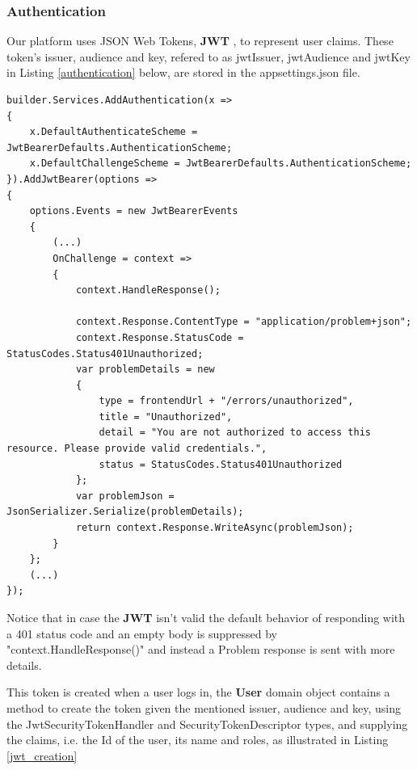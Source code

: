 \newpage

\subsubsection{Authentication}

Our platform uses JSON Web Tokens, \textbf{JWT} \cite{rfc7519}, to represent user claims.
These token's issuer, audience and key, refered to as jwtIssuer, jwtAudience and jwtKey in Listing \ref{authentication} below, are stored in the appsettings.json file.

\begin{lstlisting}[style=sharpc, caption={Custom JWT Authentication Middleware in ASP.NET Core: Handling Unauthorized Access with Detailed Problem Responses.}, label={authentication}] 
builder.Services.AddAuthentication(x =>
{
	x.DefaultAuthenticateScheme = JwtBearerDefaults.AuthenticationScheme;
	x.DefaultChallengeScheme = JwtBearerDefaults.AuthenticationScheme;
}).AddJwtBearer(options =>
{
	options.Events = new JwtBearerEvents
	{
		(...)
		OnChallenge = context =>
		{
			context.HandleResponse();
			
			context.Response.ContentType = "application/problem+json";
			context.Response.StatusCode = StatusCodes.Status401Unauthorized;
			var problemDetails = new
			{
				type = frontendUrl + "/errors/unauthorized",
				title = "Unauthorized",
				detail = "You are not authorized to access this resource. Please provide valid credentials.",
				status = StatusCodes.Status401Unauthorized
			};
			var problemJson = JsonSerializer.Serialize(problemDetails);
			return context.Response.WriteAsync(problemJson);
		}
	};
	(...)
});
\end{lstlisting}

Notice that in case the \textbf{JWT} isn't valid the default behavior of responding with a 401 status code and an empty body is suppressed by "context.HandleResponse()" and instead a Problem response is sent with more details.

This token is created when a user logs in, the \textbf{User} domain object contains a method to create the token given the mentioned issuer, audience and key, using the JwtSecurityTokenHandler and SecurityTokenDescriptor types, and supplying the claims, i.e. the Id of the user, its name and roles, as illustrated in Listing \ref{jwt_creation}

